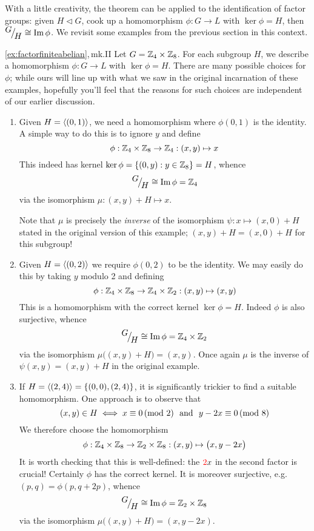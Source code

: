 \goodbreak

With a little creativity, the theorem can be applied to the identification of factor groups: given $H\triangleleft G$, cook up a homomorphism $\phi:G\to L$ with $\ker\phi =H$, then ${}^{\textstyle {G}}\!\big/_{\textstyle \!{H}}\cong\operatorname{Im}\phi$. We revisit some examples from the previous section in this context.

\begin{examples*}{\ref{ex:factorfiniteabelian},\,mk.II}{}
Let $G=\mathbb{Z}_4\times\mathbb{Z}_8$. For each subgroup $H$, we describe a homomorphism $\phi:G\to L$ with $\ker\phi =H$. There are many possible choices for $\phi$; while ours will line up with what we saw in the original incarnation of these examples, hopefully you'll feel that the reasons for such choices are independent of our earlier discussion. %
\begin{enumerate}
  \item Given $H=\left\langle (0,1)\right\rangle$, we need a homomorphism where $\phi(0,1)$ is the identity. A simple way to do this is to ignore $y$ and define
  \[\phi:\mathbb{Z}_4\times\mathbb{Z}_8\to\mathbb{Z}_4:(x,y)\mapsto x\]
  This indeed has kernel $\ker\phi=\{(0,y):y\in\mathbb{Z}_8\} =H$, whence
  \[{}^{\textstyle {G}}\!\big/_{\textstyle \!{H}}\cong\operatorname{Im}\phi=\mathbb{Z}_4\]
  via the isomorphism $\mu:(x,y)+H\mapsto x$.\par
  Note that $\mu$ is precisely the \emph{inverse} of the isomorphism $\psi:x\mapsto (x,0)+H$ stated in the original version of this example; $(x,y)+H=(x,0)+H$ for this subgroup!

  \item Given $H=\left\langle (0,2)\right\rangle$ we require $\phi(0,2)$ to be the identity. We may easily do this by taking $y$ modulo 2 and defining
  \[\phi:\mathbb{Z}_4\times\mathbb{Z}_8\to\mathbb{Z}_4\times\mathbb{Z}_2:(x,y)\mapsto (x,y)\]
  This is a homomorphism with the correct kernel $\ker\phi=H$. Indeed $\phi$ is also surjective, whence
  \[{}^{\textstyle {G}}\!\big/_{\textstyle \!{H}}\cong \operatorname{Im}\phi= \mathbb{Z}_4\times\mathbb{Z}_2\]
  via the isomorphism $\mu\bigl((x,y)+H\bigr) =(x,y)$. Once again $\mu$ is the inverse of $\psi(x,y)=(x,y)+H$ in the original example.
  
  \item If $H=\left\langle (2,4)\right\rangle=\{(0,0),(2,4)\}$, it is significantly trickier to find a suitable homomorphism. One approach is to observe that
  \[(x,y)\in H\iff x\equiv 0\negthickspace\pmod 2\ \text{ and }\ y-2x\equiv 0\negthickspace\pmod 8\]
  We therefore choose the homomorphism
  \[\phi:\mathbb{Z}_4\times\mathbb{Z}_8\to\mathbb{Z}_2\times\mathbb{Z}_8:(x,y)\mapsto\bigl(x,y-2x\bigr)\]
  It is worth checking that this is well-defined: the $\textcolor{red}{2}x$ in the second factor is crucial! Certainly $\phi$ has the correct kernel. It is moreover surjective, e.g.\ $(p,q)=\phi(p,q+2p)$, whence
  \[{}^{\textstyle {G}}\!\big/_{\textstyle \!{H}}\cong\operatorname{Im}\phi=\mathbb{Z}_2\times\mathbb{Z}_8\]
  via the isomorphism $\mu\bigl((x,y)+H\bigr)=(x,y-2x)$.
\end{enumerate}
\end{examples*}

